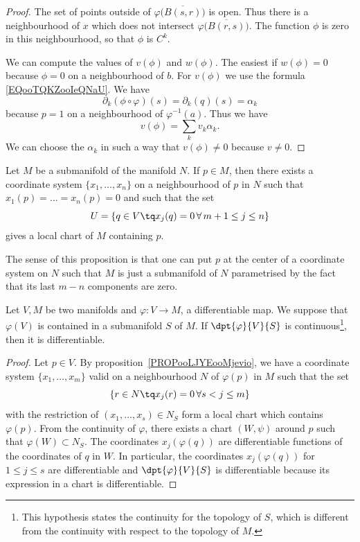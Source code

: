 \begin{proof}
	The set of points outside of \( \varphi\big( \overline{ B(s,r) } \big)\) is open. Thus there is a neighbourhood of \( x\) which does not intersect \( \varphi\big( \overline{ B(r,s) } \big)\). The function \( \phi\) is zero in this neighbourhood, so that \( \phi\) is \(  C^k\).

	We can compute the values of \( v(\phi)\) and \( w(\phi)\). The easiest if \( w(\phi)=0\) because \( \phi=0\) on a neighbourhood of \( b\). For \( v(\phi)\) we use the formula \ref{EQooTQKZooIeQNaU}. We have
	\begin{equation}
		\partial_k(\phi\circ\varphi)(s)=\partial_k(q)(s)=\alpha_k
	\end{equation}
	because \( p=1\) on a neighbourhood of \( \varphi^{-1}(a)\). Thus we have
	\begin{equation}
		v(\phi)=\sum_kv_k\alpha_k.
	\end{equation}
	We can choose the \( \alpha_k\) in such a way that \( v(\phi)\neq 0\) because \( v\neq 0\).
\end{proof}

\begin{proposition}       \label{PROPooLJYEooMjevio}
	Let $M$ be a submanifold of the manifold $N$. If $p\in M$, then there  exists a coordinate system $\{x_1,\ldots,x_n\}$ on a neighbourhood of $p$ in $N$ such that $x_1(p)=\ldots=x_n(p)=0$ and such that the set
	\[
		U=\{q\in V\tq x_j(q)=0\,\forall\, m+1\leq j\leq n\}
	\]
	gives a local chart of $M$ containing $p$.
\end{proposition}

The sense of this proposition is that one can put $p$ at the center of a coordinate system on $N$ such that $M$ is just a submanifold of $N$ parametrised by the fact that its last $m-n$ components are zero.

\begin{lemma}\label{lem:var_cont_diff}
	Let $V,M$ be two manifolds and $\varphi\colon V\to M$, a differentiable map. We suppose that $\varphi(V)$ is contained in a submanifold $S$ of $M$. If $\dpt{\varphi}{V}{S}$ is continuous\footnote{This hypothesis states the continuity for the topology of \( S\), which is different from the continuity with respect to the topology of \( M\).}, then it is differentiable.
\end{lemma}

\begin{proof}
	Let $p\in V$. By proposition~\ref{PROPooLJYEooMjevio}, we have  a coordinate system $\{x_1,\ldots,x_m\}$ valid on a neighbourhood $N$ of $\varphi(p)$ in $M$ such that the set
	\[
		\{r\in N\tq x_j(r)=0\, \forall s<j\leq m  \}
	\]
	with the restriction of $(x_1,\ldots, x_s)\in N_S$ form a local chart which contains $\varphi(p)$. From the continuity of $\varphi$, there exists a chart $(W,\psi)$ around $p$ such that $\varphi(W)\subset N_S$. The coordinates $x_j(\varphi(q))$ are differentiable functions of  the coordinates of $q$ in $W$. In particular, the coordinates $x_j(\varphi(q))$ for $1\leq j\leq s$ are differentiable and $\dpt{\varphi}{V}{S}$ is differentiable because its expression in a chart is differentiable.
\end{proof}

